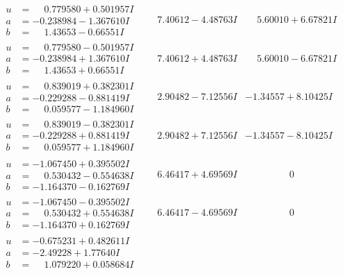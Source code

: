\documentclass[1p]{elsarticle_modified}
\theoremstyle{definition}
\begin{document}
$$\begin{array}{c|c|c}
\begin{aligned}
u &= \phantom{-}0.779580 + 0.501957 I \\
a &= -0.238984 - 1.367610 I \\
b &= \phantom{-}1.43653 - 0.66551 I\end{aligned}
 & \phantom{-}7.40612 - 4.48763 I & \phantom{-}5.60010 + 6.67821 I \\ \hline\begin{aligned}
u &= \phantom{-}0.779580 - 0.501957 I \\
a &= -0.238984 + 1.367610 I \\
b &= \phantom{-}1.43653 + 0.66551 I\end{aligned}
 & \phantom{-}7.40612 + 4.48763 I & \phantom{-}5.60010 - 6.67821 I \\ \hline\begin{aligned}
u &= \phantom{-}0.839019 + 0.382301 I \\
a &= -0.229288 - 0.881419 I \\
b &= \phantom{-}0.059577 - 1.184960 I\end{aligned}
 & \phantom{-}2.90482 - 7.12556 I & -1.34557 + 8.10425 I \\ \hline\begin{aligned}
u &= \phantom{-}0.839019 - 0.382301 I \\
a &= -0.229288 + 0.881419 I \\
b &= \phantom{-}0.059577 + 1.184960 I\end{aligned}
 & \phantom{-}2.90482 + 7.12556 I & -1.34557 - 8.10425 I \\ \hline\begin{aligned}
u &= -1.067450 + 0.395502 I \\
a &= \phantom{-}0.530432 - 0.554638 I \\
b &= -1.164370 - 0.162769 I\end{aligned}
 & \phantom{-}6.46417 + 4.69569 I & \phantom{-0.000000 } 0 \\ \hline\begin{aligned}
u &= -1.067450 - 0.395502 I \\
a &= \phantom{-}0.530432 + 0.554638 I \\
b &= -1.164370 + 0.162769 I\end{aligned}
 & \phantom{-}6.46417 - 4.69569 I & \phantom{-0.000000 } 0 \\ \hline\begin{aligned}
u &= -0.675231 + 0.482611 I \\
a &= -2.49228 + 1.77640 I \\
b &= \phantom{-}1.079220 + 0.058684 I\end{aligned}

\end{array}$$
\end{document}
